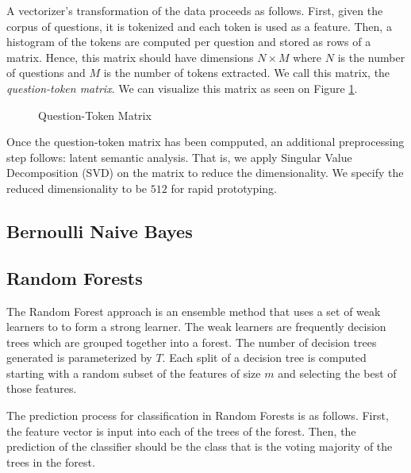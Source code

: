 \documentclass{sig-alternate}
\begin{document}
		A vectorizer's transformation of the data proceeds as follows. First,
		given the corpus of questions, it is tokenized and each token is used
		as a feature. Then, a histogram of the tokens are computed per question
		and stored as rows of a matrix. Hence, this matrix should have dimensions
		$N\times M$ where $N$ is the number of questions and $M$ is the number
		of tokens extracted. We call this matrix, the \emph{question-token
		matrix}. We can visualize this matrix as seen on Figure
		\ref{fig:vectorized_output}.
		\begin{figure}[htbp]
			\centering
			\caption{Question-Token Matrix}
			\label{fig:vectorized_output}
		\end{figure}

		Once the question-token matrix has been compputed, an additional
		preprocessing step follows: latent semantic analysis. That is, we apply
		Singular Value Decomposition (SVD) on the matrix to reduce the
		dimensionality. We specify the reduced dimensionality to be $512$ for
		rapid prototyping.

	\subsection{Bernoulli Naive Bayes} %
	\label{sub:Bernoulli Naive Bayes}


	\subsection{Random Forests} %
	\label{sub:Random Forests}

	The Random Forest approach is an ensemble method that uses a set of weak
	learners to to form a strong learner. The weak learners are frequently
	decision trees which are grouped together into a forest. The number of
	decision trees generated is parameterized by $T$. Each split of a decision
	tree is computed starting with a random subset of the features of size $m$
	and selecting the best of those features.

	The prediction process for classification in Random Forests is as follows.
	First, the feature vector is input into each of the trees of the forest.
	Then, the prediction of the classifier should be the class that is the
	voting majority of the trees in the forest.
\end{document}
